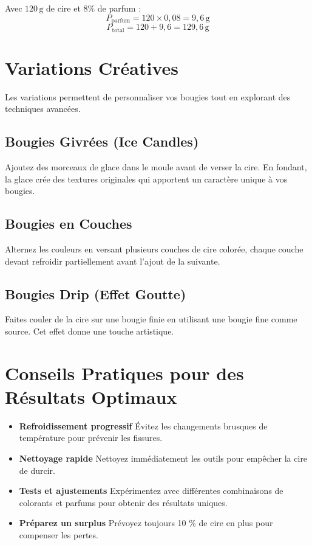 \documentclass[11pt,fleqn,onecolumn,oneside]{book}
\begin{document}
\begin{example}
Avec \(120 \, \text{g}\) de cire et \(8 \%\) de parfum :
\[
P_{\text{parfum}} = 120 \times 0,08 = 9,6 \, \text{g}
\]
\[
P_{\text{total}} = 120 + 9,6 = 129,6 \, \text{g}
\]
\end{example}
\section{Variations Créatives}

\begin{definition}
Les variations permettent de personnaliser vos bougies tout en explorant des techniques avancées.
\end{definition}

\subsection*{Bougies Givrées (Ice Candles)}
Ajoutez des morceaux de glace dans le moule avant de verser la cire. En fondant, la glace crée des textures originales qui apportent un caractère unique à vos bougies.

\subsection*{Bougies en Couches}
Alternez les couleurs en versant plusieurs couches de cire colorée, chaque couche devant refroidir partiellement avant l’ajout de la suivante.

\subsection*{Bougies Drip (Effet Goutte)}
Faites couler de la cire sur une bougie finie en utilisant une bougie fine comme source. Cet effet donne une touche artistique.

\section{Conseils Pratiques pour des Résultats Optimaux}

\begin{itemize}
    \item \textbf{Refroidissement progressif} Évitez les changements brusques de température pour prévenir les fissures.
    \item \textbf{Nettoyage rapide} Nettoyez immédiatement les outils pour empêcher la cire de durcir.
    \item \textbf{Tests et ajustements} Expérimentez avec différentes combinaisons de colorants et parfums pour obtenir des résultats uniques.
    \item \textbf{Préparez un surplus} Prévoyez toujours 10 \% de cire en plus pour compenser les pertes.
\end{itemize}
\end{document}
